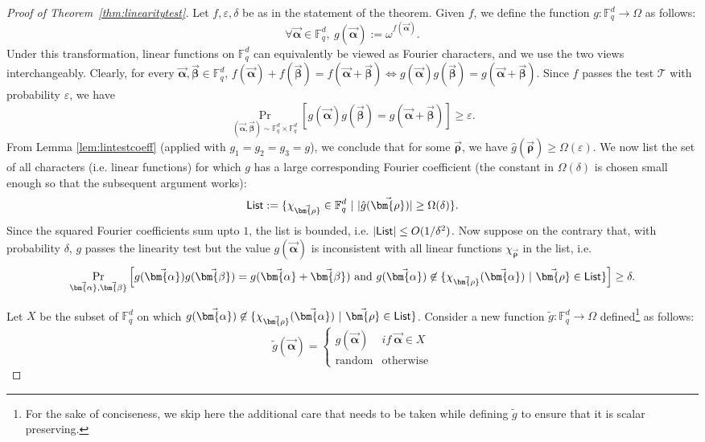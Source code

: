 \documentclass[10pt,a4paper]{article}
\newcommand{\F}{\mathbb{F}}
\renewcommand{\epsilon}{\varepsilon}
\newcommand{\alphab}{\vec{\bm{\alpha}}}
\newcommand{\betab}{\vec{\bm{\beta}}}
\renewcommand{\tilde}{\widetilde}
\newcommand{\rhob}{\vec{\bm{\rho}}}
\begin{document}
\begin{proof}[Proof of Theorem~\ref{thm:linearitytest}] Let $f, \epsilon, \delta$ be as in the statement of the theorem. 
Given $f$, we define the function $g:\F_q^d\to\Omega$ as follows:
$$
\forall \alphab\in\F_q^d,\ g(\alphab):=\omega^{f(\alphab)}.$$
Under this transformation, linear functions on $\F_q^d$ can equivalently be viewed as Fourier characters, and we use the two views interchangeably. 
Clearly, for every $\alphab,\betab\in\F_q^d$, 
$
f(\alphab)+f(\betab)=f(\alphab+\betab)\Longleftrightarrow g(\alphab)g(\betab)=g(\alphab+\betab)
$. Since $f$ passes the test ${\mathcal T}$ with probability $\epsilon$, we have
  $$ \Pr_{(\alphab,\betab)\sim \F_q^d\times \F_q^d}[g(\alphab)g(\betab)=g(\alphab+\betab)] \geq \epsilon. $$ 
From Lemma \ref{lem:lintestcoeff} (applied with $g_1=g_2=g_3=g$), we conclude that for some $\rhob$, we have $\hat{g}(\rhob) \geq \Omega(\epsilon)$.
%
%
%
%
%
%
%
%
%
%
%
%
%
%
%
%
%
%
%
%
%
We now list the set of all characters (i.e. linear functions) for which $g$ has a large corresponding Fourier coefficient (the constant 
in $\Omega(\delta)$ is chosen small enough so that the subsequent argument works):  
%
$$ {\sf List} := \{\chi_{\rhob} \in \F_q^d  ~| ~ |\hat{g}(\rhob)| \geq \Omega(\delta)  \}.  
%
%
$$
Since the squared Fourier coefficients sum upto $1$, the list is bounded, i.e. $|{\sf List}| \leq O(1/\delta^2)$. Now suppose on the 
contrary that, with probability $\delta$, $g$ passes the linearity test but the value $g(\alphab)$ is inconsistent with all linear
functions $\chi_{\rhob}$ in the list, i.e. 
%
%
%
%
%
\begin{equation} \label{eqn:inconsistent}
\Pr_{\alphab,\betab } \left[ g(\alphab) g(\betab)= g(\alphab+\betab) \ \mbox{and} \ g(\alphab) \not\in \{ \chi_{\rhob}(\alphab) ~| ~ 
\rhob \in {\sf List} \}    
%
\right] \geq \delta.
\end{equation} 

Let $X$ be the subset of $\F_q^d$ on which $g(\alphab) \not\in \{ \chi_{\rhob}(\alphab) ~| ~
\rhob \in {\sf List} \}$. Consider a new function $\tilde{g}:\F_q^d\to\Omega$ defined\footnote{For the sake of conciseness, we skip here the additional care that needs to be taken while defining  $\tilde{g}$ to ensure that it is scalar preserving. } as follows:
$$
\tilde{g}(\alphab)=\begin{cases}
g(\alphab) & if \ \alphab\in X\\
\text{random} & \text{otherwise}
\end{cases}
$$


\end{proof}
\end{document}

